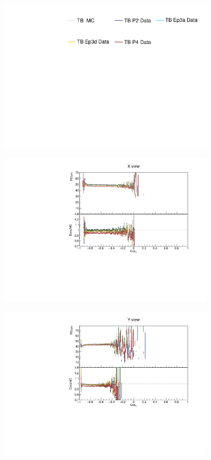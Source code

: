 \begin{figure}[!ht]
  \begin{subfigure}{\textwidth}
  \centering
    \includegraphics[height=0.2\linewidth]{essentialsec_tb/legend.pdf}
  \end{subfigure}
  \vspace*{2mm}
  
  \begin{subfigure}{0.5\textwidth}
    \includegraphics[width=\linewidth]{PlotsAngularDistribution/pecm_cosy_x.pdf}
  \end{subfigure}
  \begin{subfigure}{0.5\textwidth}
    \includegraphics[width=\linewidth]{PlotsAngularDistribution/pecm_cosy_y.pdf}

\end{subfigure}
\end{figure}
